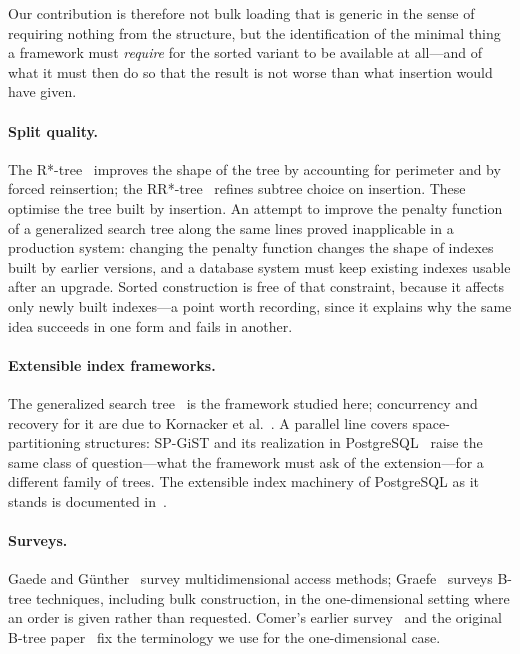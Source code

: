Our contribution is therefore not bulk loading that is generic in the sense of
requiring nothing from the structure, but the identification of the minimal
thing a framework must \emph{require} for the sorted variant to be available at
all---and of what it must then do so that the result is not worse than what
insertion would have given.

\paragraph{Split quality.} The R*-tree~\cite{beckmann1990rstar} improves the
shape of the tree by accounting for perimeter and by forced reinsertion; the
RR*-tree~\cite{beckmann2009rrstar} refines subtree choice on insertion. These
optimise the tree built by insertion. An attempt to improve the penalty
function of a generalized search tree along the same lines
\cite{borodin2017penalty} proved inapplicable in a production system: changing
the penalty function changes the shape of indexes built by earlier versions, and
a database system must keep existing indexes usable after an upgrade. Sorted
construction is free of that constraint, because it affects only newly built
indexes---a point worth recording, since it explains why the same idea
succeeds in one form and fails in another.

\paragraph{Extensible index frameworks.} The generalized search
tree~\cite{hellerstein1995generalized} is the framework studied here;
concurrency and recovery for it are due to Kornacker et
al.~\cite{kornacker1997concurrency}. A parallel line covers space-partitioning
structures: SP-GiST and its realization in
PostgreSQL~\cite{eltabakh2006spgist} raise the same class of question---what
the framework must ask of the extension---for a different family of trees. The
extensible index machinery of PostgreSQL as it stands is documented
in~\cite{rogov2026}.

\paragraph{Surveys.} Gaede and G\"unther~\cite{gaede1998multidimensional} survey
multidimensional access methods; Graefe~\cite{graefe2011modern,graefe2024more}
surveys B-tree techniques, including bulk construction, in the one-dimensional
setting where an order is given rather than requested. Comer's earlier
survey~\cite{comer1979ubiquitous} and the original B-tree
paper~\cite{bayer1972organization} fix the terminology we use for the
one-dimensional case.

